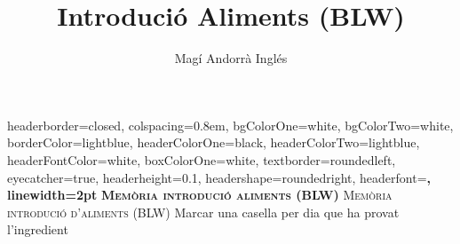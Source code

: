 \documentclass[landscape,a0paper,fontscale=0.285]{baposter} %
\title{Introdució Aliments (BLW)}
\author{Magí Andorrà Inglés}
\begin{document}
\begin{poster}
{
headerborder=closed, %
colspacing=0.8em, %
bgColorOne=white, %
bgColorTwo=white, %
borderColor=lightblue, %
headerColorOne=black, %
headerColorTwo=lightblue, %
headerFontColor=white, %
boxColorOne=white, %
textborder=roundedleft, %
eyecatcher=true, %
headerheight=0.1\textheight, %
headershape=roundedright, %
headerfont=\Large\bf\textsc, %
linewidth=2pt %
}
{\bf\textsc{Memòria introdució aliments (BLW)}\vspace{0.5em}}
{\textsc{Memòria introdució d'aliments (BLW) \hspace{12pt}}}
{Marcar una casella per dia que ha provat l'ingredient}


\end{poster}
\end{document}
